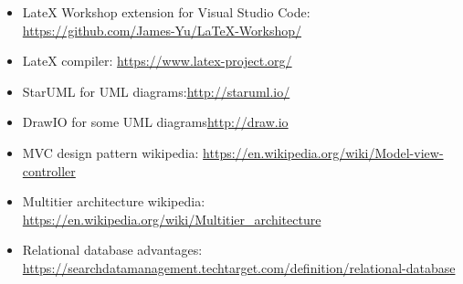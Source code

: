 \begin{itemize}
    \item LateX Workshop extension for Visual Studio Code: \newline\href{https://github.com/James-Yu/LaTeX-Workshop/}{https://github.com/James-Yu/LaTeX-Workshop/}
    \item LateX compiler: \newline\href{https://www.latex-project.org/}{https://www.latex-project.org/}
    \item StarUML for UML diagrams:\newline\href{http://staruml.io/}{http://staruml.io/}
    \item DrawIO for some UML diagrams\newline\href{http://draw.io}{http://draw.io}
    \item MVC design pattern wikipedia: \newline\href{https://en.wikipedia.org/wiki/Model-view-controller}{https://en.wikipedia.org/wiki/Model-view-controller}
    \item Multitier architecture wikipedia: \newline\href{https://en.wikipedia.org/wiki/Multitier_architecture}{https://en.wikipedia.org/wiki/Multitier\_architecture}
    \item Relational database advantages: \newline\href{https://searchdatamanagement.techtarget.com/definition/relational-database}{https://searchdatamanagement.techtarget.com/definition/relational-database}
\end{itemize}
